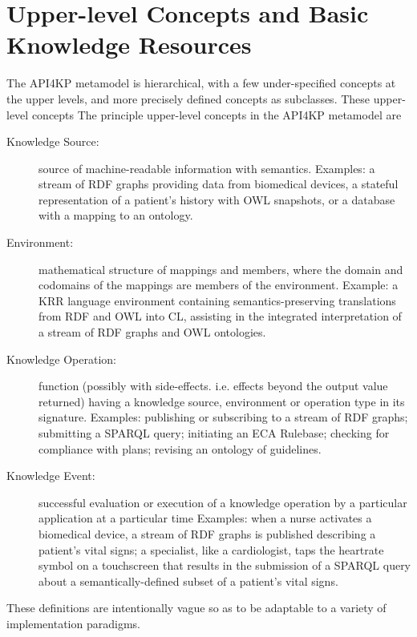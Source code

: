 \documentclass[runningheads]{llncs}
\begin{document}
\section{Upper-level Concepts and Basic Knowledge Resources}
\label{sec:metamodel}
The API4KP metamodel is hierarchical, with a few under-specified concepts at the upper levels, and more precisely defined concepts as subclasses.
These upper-level concepts
The principle upper-level concepts in the API4KP metamodel are
\begin{description}
\item[Knowledge Source:] source of machine-readable information with semantics. Examples: a stream of RDF graphs providing data from biomedical devices, a stateful representation of a patient's history with OWL snapshots, or a database with a mapping to an ontology.
\item[Environment:] mathematical structure of mappings and members, where the domain and codomains of the mappings are members of the environment.  Example: a KRR language environment containing semantics-preserving translations from RDF and OWL into CL, assisting in the integrated interpretation of a stream of RDF graphs and OWL ontologies.
\item[Knowledge Operation:] function (possibly with side-effects. i.e. effects beyond the output value returned) having a knowledge source, environment or operation type in its signature. Examples: 
 publishing or subscribing to a stream of RDF graphs;
 submitting a SPARQL query;
 initiating an ECA Rulebase;
 checking for compliance with plans;
 revising an ontology of guidelines.
\item[Knowledge Event:] 
successful evaluation or execution of a knowledge operation by a particular application at a particular time
Examples:
when a nurse activates a biomedical device, a stream of RDF graphs is published describing a patient's vital signs;
a specialist, like a cardiologist, taps the heartrate symbol on a touchscreen that results in the submission of a SPARQL query about a semantically-defined subset of a patient's vital signs.
\end{description}
These definitions are intentionally vague so as to be adaptable to a variety of implementation paradigms.
\end{document}

